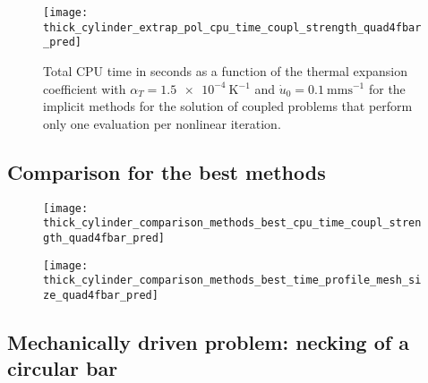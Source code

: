 \begin{figure}
  \texttt{[image: thick\_cylinder\_extrap\_pol\_cpu\_time\_coupl\_strength\_quad4fbar\_pred]}
  \caption{Total CPU time in seconds as a function of the thermal expansion coefficient with \(\alpha_T=\SI{1.5e-4}{\kelvin^{-1}}\) and \(\dot u_0 =\SI{0.1}{\milli\meter\second^{-1}}\) for the implicit methods for the solution of coupled problems that perform only one evaluation per nonlinear iteration.}
\label{fig:thick_cylinder_extrap_pol_cpu_time_coupl_strength_quad4fbar_pred}
\end{figure}


\FloatBarrier

\subsection{Comparison for the best methods}

\begin{figure}
\texttt{[image: thick\_cylinder\_comparison\_methods\_best\_cpu\_time\_coupl\_strength\_quad4fbar\_pred]}
\end{figure}

\begin{figure}
\texttt{[image: thick\_cylinder\_comparison\_methods\_best\_time\_profile\_mesh\_size\_quad4fbar\_pred]}
\end{figure}


\subsection{Mechanically driven problem: necking of a circular bar}
\label{sec:mech-driv-probl}

